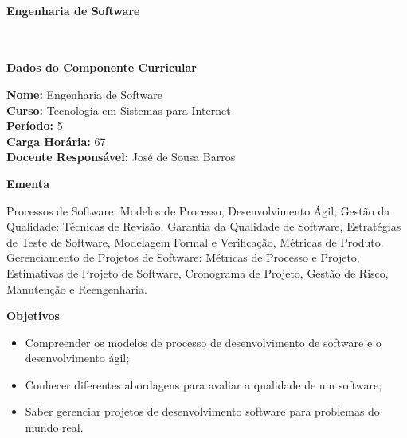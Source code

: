 \paragraph{Engenharia de Software} \



\begin{snugshade}\begin{center}\textbf{
	Dados do Componente Curricular
}\end{center}\end{snugshade}

\noindent 	\textbf{Nome:} Engenharia de Software
\\ 			\textbf{Curso:} Tecnologia em Sistemas para Internet
\\ 			\textbf{Período:} \unit{5}{\degree}
\\ 			\textbf{Carga Horária:} \unit{67}{\hour}
\\ 			\textbf{Docente Responsável:} José de Sousa Barros 



\begin{snugshade}\begin{center}\textbf{
    Ementa
\vphantom{q}}\end{center}\end{snugshade}

\noindent
Processos de Software: Modelos de Processo, Desenvolvimento Ágil;
Gestão da Qualidade: Técnicas de Revisão, Garantia da Qualidade de Software, Estratégias de Teste de Software, Modelagem Formal e Verificação, Métricas de Produto. Gerenciamento de Projetos de Software: Métricas de Processo e Projeto, Estimativas de Projeto de Software, Cronograma de Projeto, Gestão de Risco, Manutenção e Reengenharia.



\begin{snugshade}\begin{center}\textbf{
    Objetivos
}\end{center}\end{snugshade}


\begin{itemize}

\item Compreender os modelos de processo de desenvolvimento de software e o desenvolvimento ágil;
\item Conhecer diferentes abordagens para avaliar a qualidade de um software;
\item Saber gerenciar projetos de desenvolvimento software para problemas do mundo real.

\end{itemize}

